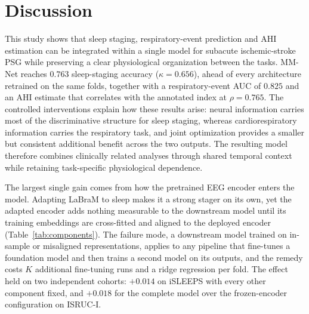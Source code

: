 \documentclass{ieeeaccess}
\newcommand{\mmAcc}{0.763}
\newcommand{\mmK}{0.656}
\newcommand{\mmAuc}{0.825}
\newcommand{\mmRho}{0.765}
\begin{document}
\begin{table}[t]
\caption{Model size and output capability of the evaluated architectures, including whether each model supports sleep staging, respiratory-event prediction, or both.}
\label{tab:cost}
\centering
\setlength{\tabcolsep}{4pt}
\end{table}

\section{Discussion}
\label{sec:discussion}

This study shows that sleep staging, respiratory-event prediction and AHI estimation can be
integrated within a single model for subacute ischemic-stroke PSG while
preserving a clear physiological organization between the tasks. MM-Net
reaches $\mmAcc$ sleep-staging accuracy ($\kappa=\mmK$), ahead of every architecture retrained
on the same folds, together with a respiratory-event AUC of $\mmAuc$ and an AHI estimate that
correlates with the annotated index at $\rho=\mmRho$. The controlled interventions explain how
these results arise: neural information carries most of the discriminative structure for sleep
staging, whereas cardiorespiratory information carries the respiratory task, and joint
optimization provides a smaller but consistent additional benefit across the two outputs. The
resulting model therefore combines clinically related analyses through shared temporal context
while retaining task-specific physiological dependence.

The largest single gain comes from how the pretrained EEG encoder enters the model. Adapting
LaBraM to sleep makes it a strong stager on its own, yet the adapted encoder adds nothing
measurable to the downstream model until its training embeddings are cross-fitted and aligned
to the deployed encoder (Table~\ref{tab:components}). The failure mode, a downstream model
trained on in-sample or misaligned representations, applies to any pipeline that fine-tunes a
foundation model and then trains a second model on its outputs, and the remedy costs $K$
additional fine-tuning runs and a ridge regression per fold. The effect held on two independent
cohorts: $+0.014$ on iSLEEPS with every other component fixed, and $+0.018$ for the complete model
over the frozen-encoder configuration on ISRUC-I.
\end{document}
